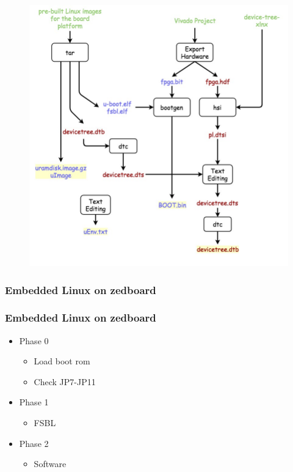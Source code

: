\documentclass{beamer}
\begin{document}
\begin{frame}
\begin{figure}
\raggedright\includegraphics[scale=0.2]{image/embedded_linux.jpg}
\end{figure}
\end{frame}
\begin{frame}
\frametitle{Embedded Linux on zedboard}
\begin{figure}

\end{figure}
\end{frame}




\begin{frame}
\frametitle{Embedded Linux on zedboard}
\begin{itemize}
\item Phase 0
	\begin{itemize}
	\item Load boot rom
	\item Check JP7-JP11
	\end{itemize}
\item Phase 1
	\begin{itemize}
	\item FSBL
	\end{itemize}
\item Phase 2
	\begin{itemize}
	\item Software 
	\end{itemize}
\end{itemize}
\end{frame}
\end{document}
